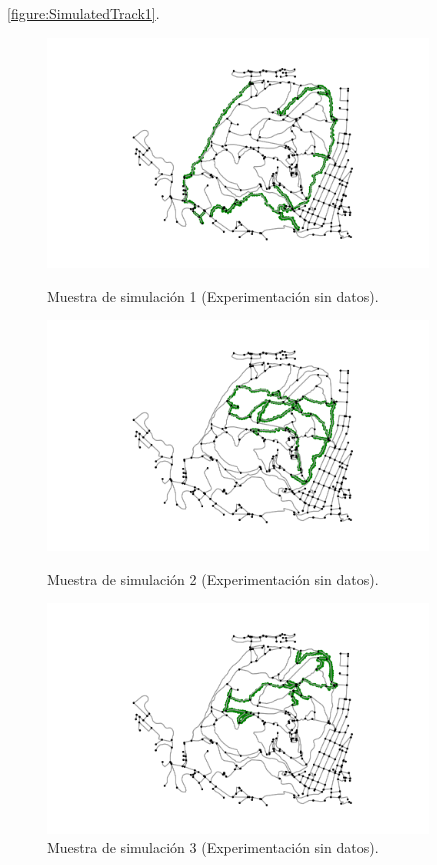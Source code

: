 \ref{figure:SimulatedTrack1}.
\begin{figure}[!htb]
\centering
\begin{minipage}{0.70\textwidth}
\includegraphics[width=0.9\textwidth]{./Imagenes/SimulatedTrack1Empty.png}
\caption{Muestra de simulación 1 (Experimentación sin datos).}
\label{figure:SimulatedTrack1}
\end{minipage}
\begin{minipage}{0.48\textwidth}
\includegraphics[width=0.9\textwidth]{./Imagenes/SimulatedTrack2Empty.png}
\caption{Muestra de simulación 2 (Experimentación sin datos).}
\label{figure:SimulatedTrack2}
\end{minipage}
\hfill 
\begin{minipage}{0.48\textwidth}
\includegraphics[width=0.9\textwidth]{./Imagenes/SimulatedTrack3Empty.png}
\caption{Muestra de simulación 3 (Experimentación sin datos).}
\label{figure:SimulatedTrack3}
\end{minipage}
\end{figure}
\newpage

